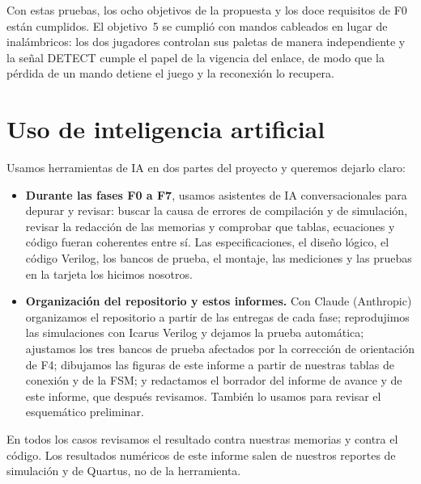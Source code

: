 \documentclass[conference,a4paper]{IEEEtran}
\begin{document}
Con estas pruebas, los ocho objetivos de la propuesta y los doce requisitos de F0 están cumplidos. El objetivo~5 se cumplió con mandos cableados en lugar de inalámbricos: los dos jugadores controlan sus paletas de manera independiente y la señal DETECT cumple el papel de la vigencia del enlace, de modo que la pérdida de un mando detiene el juego y la reconexión lo recupera.

\section{Uso de inteligencia artificial}

Usamos herramientas de IA en dos partes del proyecto y queremos dejarlo claro:

\begin{itemize}
\item \textbf{Durante las fases F0 a F7}, usamos asistentes de IA conversacionales para depurar y revisar: buscar la causa de errores de compilación y de simulación, revisar la redacción de las memorias y comprobar que tablas, ecuaciones y código fueran coherentes entre sí. Las especificaciones, el diseño lógico, el código Verilog, los bancos de prueba, el montaje, las mediciones y las pruebas en la tarjeta los hicimos nosotros.
\item \textbf{Organización del repositorio y estos informes.} Con Claude (Anthropic) organizamos el repositorio a partir de las entregas de cada fase; reprodujimos las simulaciones con Icarus Verilog y dejamos la prueba automática; ajustamos los tres bancos de prueba afectados por la corrección de orientación de F4; dibujamos las figuras de este informe a partir de nuestras tablas de conexión y de la FSM; y redactamos el borrador del informe de avance y de este informe, que después revisamos. También lo usamos para revisar el esquemático preliminar.
\end{itemize}

En todos los casos revisamos el resultado contra nuestras memorias y contra el código. Los resultados numéricos de este informe salen de nuestros reportes de simulación y de Quartus, no de la herramienta.

\end{document}
